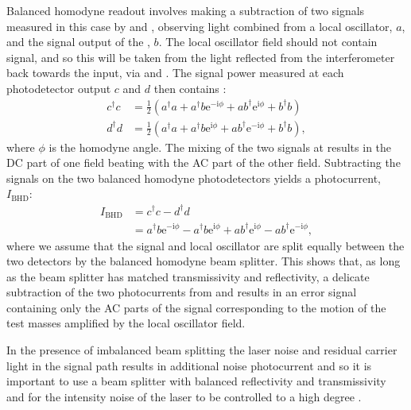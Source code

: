 Balanced homodyne readout involves making a subtraction of two signals measured in this case by \HDA{} and \HDB{}, observing light combined from a local oscillator, $a$, and the signal output of the \SSM{}, $b$. The local oscillator field should not contain signal, and so this will be taken from the light reflected from the interferometer back towards the input, via \MTWELVE{} and \MTHIRTEEN{}. The signal power measured at each photodetector output $c$ and $d$ then contains \cite{Steinlechner2015}:
\begin{equation}
  \begin{split}
    c^{\dag} c &= \frac{1}{2} \left( a^{\dag} a + a^{\dag} b \text{e}^{-\text{i} \phi} + a b^{\dag} \text{e}^{\text{i} \phi} + b^{\dag} b \right) \\
    d^{\dag} d &= \frac{1}{2} \left( a^{\dag} a + a^{\dag} b \text{e}^{\text{i} \phi} + a b^{\dag} \text{e}^{-\text{i} \phi} + b^{\dag} b \right),
  \end{split}
\end{equation}
where $\phi$ is the homodyne angle. The mixing of the two signals at \MSIXTEEN{} results in the \gls{DC} part of one field beating with the \gls{AC} part of the other field. Subtracting the signals on the two balanced homodyne photodetectors yields a photocurrent, $I_{\text{BHD}}$:
\begin{equation}
  \begin{split}
    I_{\text{BHD}} &= c^{\dag} c - d^{\dag} d \\
                   &= a^{\dag} b \text{e}^{-\text{i} \phi} - a^{\dag} b \text{e}^{\text{i} \phi} + a b^{\dag} \text{e}^{\text{i} \phi} - a b^{\dag} \text{e}^{-\text{i} \phi},
  \end{split}
\end{equation}
where we assume that the signal and local oscillator are split equally between the two detectors by the balanced homodyne beam splitter. This shows that, as long as the beam splitter has matched transmissivity and reflectivity, a delicate subtraction of the two photocurrents from \HDA{} and \HDB{} results in an error signal containing only the \gls{AC} parts of the signal corresponding to the motion of the test masses amplified by the local oscillator field.

In the presence of imbalanced beam splitting the laser noise and residual carrier light in the signal path results in additional noise photocurrent and so it is important to use a beam splitter with balanced reflectivity and transmissivity and for the intensity noise of the laser to be controlled to a high degree \cite{Steinlechner2015}.

